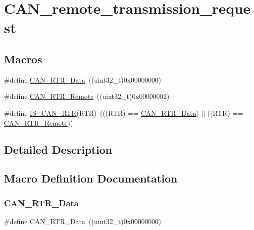 \hypertarget{group___c_a_n__remote__transmission__request}{}\section{C\+A\+N\+\_\+remote\+\_\+transmission\+\_\+request}
\label{group___c_a_n__remote__transmission__request}
\subsection*{Macros}
\begin{DoxyCompactItemize}
\item 
\#define \mbox{\hyperlink{group___c_a_n__remote__transmission__request_ga2407c3a8b2cd97bd651143aa959219f1}{C\+A\+N\+\_\+\+R\+T\+R\+\_\+\+Data}}~((uint32\+\_\+t)0x00000000)
\item 
\#define \mbox{\hyperlink{group___c_a_n__remote__transmission__request_ga42e95ddfb02d88c82de84058fb0fb349}{C\+A\+N\+\_\+\+R\+T\+R\+\_\+\+Remote}}~((uint32\+\_\+t)0x00000002)
\item 
\#define \mbox{\hyperlink{group___c_a_n__remote__transmission__request_ga3379997ad4da6fc4d7975c52b891bdc0}{I\+S\+\_\+\+C\+A\+N\+\_\+\+R\+TR}}(R\+TR)~(((R\+TR) == \mbox{\hyperlink{group___c_a_n__remote__transmission__request_ga2407c3a8b2cd97bd651143aa959219f1}{C\+A\+N\+\_\+\+R\+T\+R\+\_\+\+Data}}) $\vert$$\vert$ ((R\+TR) == \mbox{\hyperlink{group___c_a_n__remote__transmission__request_ga42e95ddfb02d88c82de84058fb0fb349}{C\+A\+N\+\_\+\+R\+T\+R\+\_\+\+Remote}}))
\end{DoxyCompactItemize}


\subsection{Detailed Description}


\subsection{Macro Definition Documentation}
\mbox{\label{group___c_a_n__remote__transmission__request_ga2407c3a8b2cd97bd651143aa959219f1}} 
\subsubsection{\texorpdfstring{CAN\_RTR\_Data}{CAN\_RTR\_Data}}
{\footnotesize\ttfamily \#define C\+A\+N\+\_\+\+R\+T\+R\+\_\+\+Data~((uint32\+\_\+t)0x00000000)}

